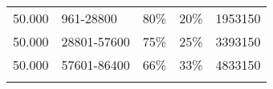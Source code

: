 \documentclass[11pt,a4paperpaper,]{report}
\begin{document}
\begin{longtable}[]{@{}lllcl@{}}
\begin{minipage}[t]{0.16\columnwidth}\raggedright\strut
50.000\strut
\end{minipage} & \begin{minipage}[t]{0.19\columnwidth}\raggedright\strut
961-28800\strut
\end{minipage} & \begin{minipage}[t]{0.10\columnwidth}\raggedright\strut
80\%\strut
\end{minipage} & \begin{minipage}[t]{0.10\columnwidth}\centering\strut
20\%\strut
\end{minipage} & \begin{minipage}[t]{0.16\columnwidth}\raggedright\strut
1953150\strut
\end{minipage}\tabularnewline
\begin{minipage}[t]{0.16\columnwidth}\raggedright\strut
50.000\strut
\end{minipage} & \begin{minipage}[t]{0.19\columnwidth}\raggedright\strut
28801-57600\strut
\end{minipage} & \begin{minipage}[t]{0.10\columnwidth}\raggedright\strut
75\%\strut
\end{minipage} & \begin{minipage}[t]{0.10\columnwidth}\centering\strut
25\%\strut
\end{minipage} & \begin{minipage}[t]{0.16\columnwidth}\raggedright\strut
3393150\strut
\end{minipage}\tabularnewline
\begin{minipage}[t]{0.16\columnwidth}\raggedright\strut
50.000\strut
\end{minipage} & \begin{minipage}[t]{0.19\columnwidth}\raggedright\strut
57601-86400\strut
\end{minipage} & \begin{minipage}[t]{0.10\columnwidth}\raggedright\strut
66\%\strut
\end{minipage} & \begin{minipage}[t]{0.10\columnwidth}\centering\strut
33\%\strut
\end{minipage} & \begin{minipage}[t]{0.16\columnwidth}\raggedright\strut
4833150\strut
\end{minipage}\tabularnewline
\begin{minipage}[t]{0.16\columnwidth}\raggedright\strut

\end{minipage}
\end{longtable}
\end{document}
